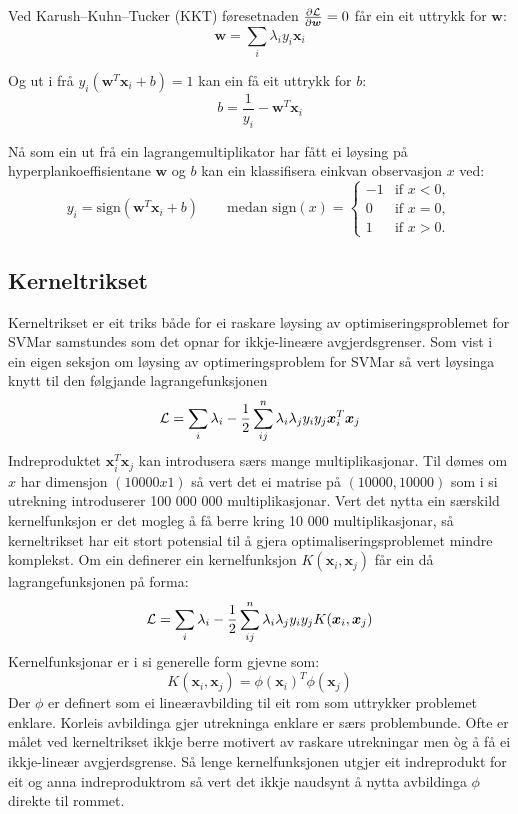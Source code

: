 \documentclass[oneside, nynorsk]{book}
\begin{document}
Ved Karush–Kuhn–Tucker (KKT) føresetnaden $\frac{\partial {\cal L}}{\partial \boldsymbol{w}} = 0$ får ein eit uttrykk for $\boldsymbol{w}$:
\[\boldsymbol{w}=\sum_{i} \lambda_iy_i\boldsymbol{x}_i\]

Og ut i frå $y_i(\boldsymbol{w}^T\boldsymbol{x}_i+b)=1$ kan ein få eit uttrykk for $b$:
\[b = \frac{1}{y_i}-\boldsymbol{w}^T\boldsymbol{x}_i\]

Nå som ein ut frå ein lagrangemultiplikator har fått ei løysing på hyperplankoeffisientane $\boldsymbol{w}$ og $b$ kan ein klassifisera einkvan observasjon $x$ ved:
\[y_i = \mathrm{sign}(\boldsymbol{w}^T\boldsymbol{x}_i+b) \qquad \text{medan $\mathrm{sign}(x) = \begin{cases}
-1 & \text{if } x < 0, \\
0 & \text{if } x = 0, \\
1 & \text{if } x > 0. \end{cases}$}\]
\subsection{Kerneltrikset}
Kerneltrikset er eit triks både for ei raskare løysing av optimiseringsproblemet for SVMar samstundes som det opnar for ikkje-lineære avgjerdsgrenser.
Som vist i ein eigen seksjon om løysing av optimeringsproblem for SVMar så vert løysinga knytt til den følgjande lagrangefunksjonen
\[{\cal L}=\sum_i\lambda_i-\frac{1}{2}\sum_{ij}^n\lambda_i\lambda_jy_iy_j\boldsymbol{x}_i^T\boldsymbol{x}_j\]
Indreproduktet $\boldsymbol{x}_i^T\boldsymbol{x}_j$ kan introdusera særs mange multiplikasjonar. Til dømes om $x$ har dimensjon $(10000x1)$
så vert det ei matrise på $(10 000,10 000)$ som i si utrekning introduserer 100 000 000 multiplikasjonar. Vert det nytta ein særskild kernelfunksjon er det mogleg å
få berre kring 10 000 multiplikasjonar, så kerneltrikset har eit stort potensial til å gjera optimaliseringsproblemet mindre komplekst.
Om ein definerer ein kernelfunksjon $K(\boldsymbol{x}_i,\boldsymbol{x}_j)$ får ein då lagrangefunksjonen på forma:
\[{\cal L}=\sum_i\lambda_i-\frac{1}{2}\sum_{ij}^n\lambda_i\lambda_jy_iy_jK(\boldsymbol{x}_i,\boldsymbol{x}_j)\]
Kernelfunksjonar er i si generelle form gjevne som:
\[K(\boldsymbol{x}_i,\boldsymbol{x}_j)=\phi(\boldsymbol{x}_i)^T\phi(\boldsymbol{x}_j) \]
Der $\phi$ er definert som ei lineæravbilding til eit rom som uttrykker problemet enklare. Korleis avbildinga gjer utrekninga enklare er særs problembunde.
Ofte er målet ved kerneltrikset ikkje berre motivert av raskare utrekningar men òg å få ei ikkje-lineær avgjerdsgrense.
Så lenge kernelfunksjonen utgjer eit indreprodukt for eit og anna indreproduktrom så vert det ikkje naudsynt å nytta avbildinga $\phi$ direkte til rommet.
\end{document}
